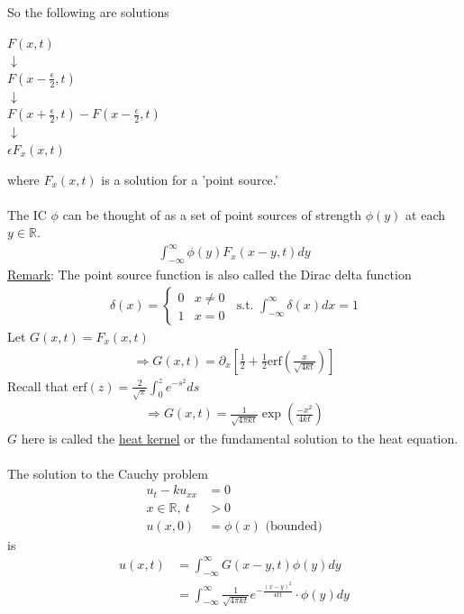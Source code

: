 \documentclass[12pt, letterpaper]{article}
\begin{document}
So the following are solutions
\begin{center}
    $F(x,t)$ \\
    $\downarrow$ \\
    $F(x-\frac{\epsilon}{2},t)$ \\
    $\downarrow$ \\
    $F(x+\frac \epsilon 2 , t) - F(x-\frac \epsilon 2, t)$ \\
    $\downarrow$ \\
    $\epsilon F_x(x,t)$
\end{center}
where $F_x(x,t)$ is a solution for a 'point source.' \\ \\
The IC $\phi$ can be thought of as a set of point sources of strength $\phi(y)$ at each 
$y \in \mathbb{R}$.
\begin{align*}
    \int_{-\infty}^{\infty} \phi(y)F_x(x-y,t)dy 
\end{align*}
\underline{Remark}: The point source function is also called the Dirac delta function
\begin{align*}
    \delta(x) = \begin{cases}
        0 & x \ne 0 \\
        1 & x = 0
    \end{cases}\ 
    \text{ s.t. } \int_{-\infty}^{\infty} \delta(x)dx = 1
\end{align*}
Let $G(x,t) = F_x(x,t)$
\begin{align*}
    \Rightarrow G(x,t) = \partial_x \left[\frac 12 + \frac 12 \text{erf}\left(\frac{x}{\sqrt{4kt}}\right)\right]
\end{align*}
Recall that $\text{erf}(z) = \frac{2}{\sqrt{\pi}}\int_{0}^{z}e^{-s^2}ds$
\begin{align*}
    \Rightarrow G(x,t) = \frac{1}{\sqrt{4\pi k t}}\exp\left( \frac{-x^2}{4kt} \right) 
\end{align*}
$G$ here is called the \underline{heat kernel} or the fundamental solution to the heat equation. \\ \\
The solution to the Cauchy problem 
\begin{align*}
    u_t - ku_{xx} &= 0 \\
    x\in \mathbb{R},\ t &> 0 \\
    u(x,0) &= \phi(x) \text{ (bounded)}
\end{align*}
is 
\begin{align*}
    u(x,t) &= \int_{-\infty}^{\infty} G(x-y,t)\phi(y)dy \\
    &= \int_{-\infty}^{\infty} \frac{1}{\sqrt{4\pi kt}}e^{-\frac{(x-y)^2}{4kt}}\cdot \phi(y)dy
\end{align*}
\end{document}
